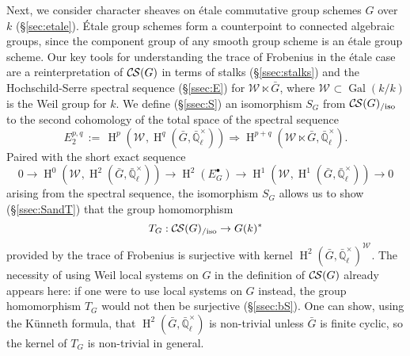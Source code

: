 \documentclass[10pt]{amsart}
\theoremstyle{plain}
\theoremstyle{definition}
\theoremstyle{remark}
\newcommand{\EE}{\mathbb{\bar Q}_\ell}
\newcommand{\bFq}{\bar{k}}
\newcommand{\Fq}{k}
\newcommand{\EEx}{\EE^\times}
\newcommand{\Weil}[1]{\mathcal{W}_{#1}}
\DeclareMathOperator{\Gal}{Gal}
\DeclareMathOperator{\Hom}{Hom}
\DeclareMathOperator{\Hh}{H}
\newcommand{\ceq}{{\, :=\, }}
\newcommand{\TrFrob}[1]{T_{#1}}
\newcommand{\gcs}[1]{{\mathcal{\bar #1}}}
\newcommand{\CS}{{\mathcal{C\hskip-0.8pt S}}}
\newcommand{\CSiso}[1]{\CS(#1)_{/\text{iso}}}
\newcommand{\bG}{\bar{G}}
\begin{document}
Next, we consider character sheaves on \'etale commutative group schemes $G$ over $\Fq$ (\S\ref{sec:etale}).
\'Etale group schemes form a counterpoint to connected algebraic groups, since the component group of any smooth group scheme is an \'etale group scheme.
Our key tools for understanding the trace of Frobenius in the \'etale case 
are a reinterpretation of $\CS(G)$ in terms of stalks (\S\ref{ssec:stalks}) and 
 the Hochschild-Serre spectral sequence (\S\ref{ssec:E}) for $\Weil{} \ltimes \bG$, where $\Weil{} \subset \Gal(\Fq/\Fq)$ is the Weil group for $\Fq$.
We define (\S\ref{ssec:S}) an isomorphism $S_G$ from $\CSiso{G}$ to the second cohomology of the total space of the spectral sequence
\[
E_2^{p,q} \ceq \Hh^p(\Weil{}, \Hh^q(\bG, \EEx)) \Rightarrow \Hh^{p+q}(\Weil{} \ltimes \bG, \EEx).
\]
Paired with the short exact sequence
\[
  0 \to \Hh^0(\Weil{},\Hh^2({\bar G},\EEx)) \to \Hh^2(E^\bullet_G) \to \Hh^1(\Weil{},\Hh^1({\bar G},\EEx)) \to 0
\]
arising from the spectral sequence, the isomorphism $S_G$ allows us to show (\S\ref{ssec:SandT}) that 
the group homomorphism 
\[
\TrFrob{G}: \CSiso{G} \to G(\Fq)^*
\]
provided by the trace of Frobenius is surjective with kernel $\Hh^2(\bG,\EEx)^{\Weil{}}$.
The necessity of using Weil local systems on $G$ in the definition of $\CS(G)$ already appears here:  if one were to use local systems on $G$ instead, the group homomorphism $\TrFrob{G}$ would not then be surjective (\S \ref{ssec:bS}). 
One can show, using the K\"unneth formula, that $\Hh^2(\bG,\EEx)$ is non-trivial unless $\bG$ is finite cyclic, so the kernel of $\TrFrob{G}$ is non-trivial in general.


\end{document}
